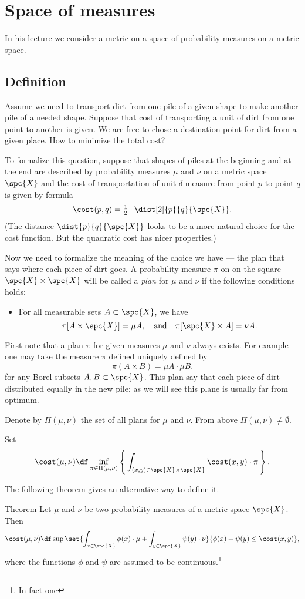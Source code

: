 \chapter{Space of measures}

In his lecture we consider a metric on a space of probability measures on a metric space.

\section{Definition}

Assume we need to transport dirt from one pile of a given shape to make another pile of a needed shape.
Suppose that cost of transporting a unit of dirt from one point to another is given.
We are free to chose a destination point for dirt from a given place.
How to minimize the total cost?

To formalize this question, suppose that shapes of piles at the beginning and at the end are described by probability measures $\mu$ and $\nu$ on a metric space $\spc{X}$ and the cost of transportation 
of unit $\delta$-measure from point $p$ to point $q$ is given by formula
\[\cost(p,q)=\tfrac12\cdot\dist[2]{p}{q}{\spc{X}}.\]
(The distance $\dist{p}{q}{\spc{X}}$ looks to be a more natural choice for the cost function.
But the quadratic cost has nicer properties.)

Now we need to formalize the meaning of the choice we have --- the plan that says where each piece of dirt goes.
A probability measure $\pi$ on on the square $\spc{X}\times\spc{X}$ will be called a \emph{plan} for $\mu$ and $\nu$ if the following conditions holds:
\begin{itemize}
\item For all measurable sets $A \subset \spc{X}$, we have 
\[\pi [A \times \spc{X}] = \mu A,\quad\text{and}\quad \pi [  \spc{X}\times A] = \nu A.\]
\end{itemize}

First note that a plan $\pi$ for given measures $\mu$ and $\nu$ always exists.
For example one may take the measure $\pi$ defined uniquely defined by 
\[\pi(A\times B)=\mu A\cdot \mu B.\]
for any Borel subsets $A,B\subset\spc{X}$.
This plan say that each piece of dirt distributed equally in the new pile; as we will see this plane is usually far from optimum.

Denote by $\Pi(\mu,\nu)$ the set of all plans for $\mu$ and $\nu$.
From above $\Pi(\mu,\nu)\ne\emptyset$.

Set
\[\cost(\mu,\nu)
\df
\inf_{\pi\in\Pi(\mu,\nu)}
\left\{\,\int_{(x,y)\in\spc{X}\times\spc{X}}\cost(x,y)\cdot\pi\,\right\}.\]

The following theorem gives an alternative way to define it.

\begin{thm}{Theorem}
Let $\mu$ and $\nu$ be two probability measures of a metric space $\spc{X}$.
Then 
\[\cost(\mu,\nu)
\df
\sup\set{\int_{x\in\spc{X}}\phi(x)\cdot\mu+\int_{y\in\spc{X}}\psi(y)\cdot\nu}{\phi(x)+\psi(y)\le \cost(x,y)},\]
where the functions $\phi$ and $\psi$ are assumed to be continuous.\footnote{In fact one }
\end{thm}




